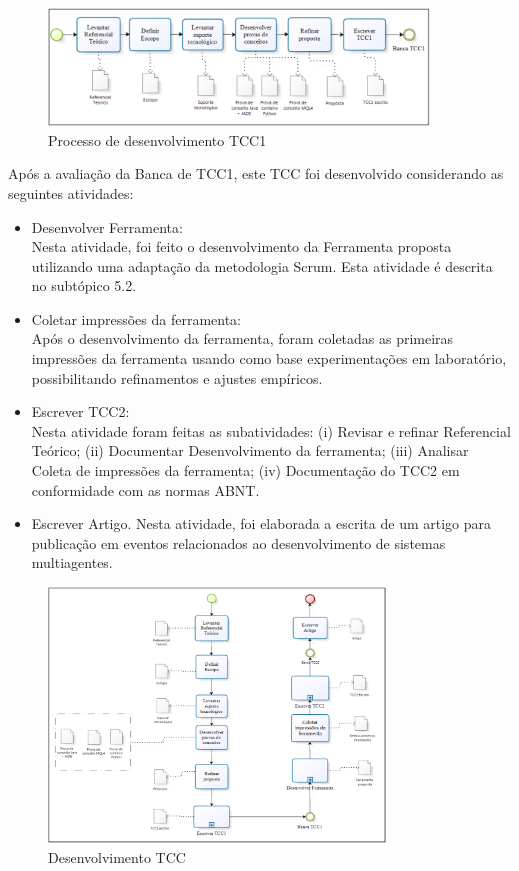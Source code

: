 \begin{figure}[h]
\centering
\label{f26}
\includegraphics[width=0.9\textwidth]{figuras/f26}
\caption{Processo de desenvolvimento TCC1}
\end{figure}

Após a avaliação da Banca de TCC1, este TCC foi desenvolvido considerando as seguintes atividades:

\begin{itemize}
\item Desenvolver Ferramenta:\\
Nesta atividade, foi feito o desenvolvimento da Ferramenta proposta utilizando uma adaptação da metodologia Scrum. Esta atividade é descrita no subtópico 5.2.

\item Coletar impressões da ferramenta:\\
Após o desenvolvimento da ferramenta, foram coletadas as primeiras impressões da ferramenta usando como base experimentações em laboratório, possibilitando refinamentos e ajustes empíricos.

\item Escrever TCC2:\\
Nesta atividade foram feitas as subatividades: (i) Revisar e  refinar Referencial Teórico; (ii) Documentar Desenvolvimento da ferramenta; (iii) Analisar Coleta de impressões da ferramenta; (iv) Documentação do TCC2 em conformidade com as normas ABNT.

\item Escrever Artigo.
Nesta atividade, foi elaborada a escrita de um artigo para publicação em eventos relacionados ao desenvolvimento de sistemas multiagentes.

\end{itemize}

\begin{figure}[h]
\centering
\label{f27}
\includegraphics[width=0.8\textwidth]{figuras/f27}
\caption{Desenvolvimento TCC}
\end{figure}

